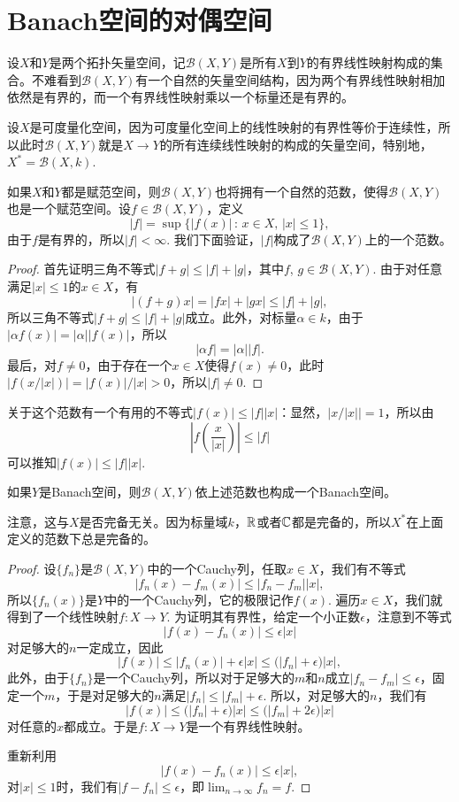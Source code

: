 \chapter{Banach空间的对偶空间}

\begin{para}
设$X$和$Y$是两个拓扑矢量空间，记$\mathcal{B}(X,Y)$是所有$X$到$Y$的有界线性映射构成的集合。不难看到$\mathcal{B}(X,Y)$有一个自然的矢量空间结构，因为两个有界线性映射相加依然是有界的，而一个有界线性映射乘以一个标量还是有界的。

设$X$是可度量化空间，因为可度量化空间上的线性映射的有界性等价于连续性，所以此时$\mathcal{B}(X,Y)$就是$X\to Y$的所有连续线性映射的构成的矢量空间，特别地，$X^*=\mathcal{B}(X,k)$.

如果$X$和$Y$都是赋范空间，则$\mathcal{B}(X,Y)$也将拥有一个自然的范数，使得$\mathcal{B}(X,Y)$也是一个赋范空间。设$f\in \mathcal{B}(X,Y)$，定义
\[
	|f|=\sup\bigl\{|f(x)|\,:\,x\in X,\,|x|\leq 1\bigr\},
\]
由于$f$是有界的，所以$|f|<\infty$. 我们下面验证，$|f|$构成了$\mathcal{B}(X,Y)$上的一个范数。

\begin{proof}
首先证明三角不等式$|f+g|\leq |f|+|g|$，其中$f$, $g\in \mathcal{B}(X,Y)$. 由于对任意满足$|x|\leq 1$的$x\in X$，有
\[
	|(f+g)x|=|fx|+|gx|\leq |f|+|g|,
\]
所以三角不等式$|f+g|\leq |f|+|g|$成立。此外，对标量$\alpha\in k$，由于$|\alpha f(x)|=|\alpha||f(x)|$，所以
\[
	|\alpha f|=|\alpha||f|.
\]
最后，对$f\neq 0$，由于存在一个$x\in X$使得$f(x)\neq 0$，此时$|f(x/|x|)|=|f(x)|/|x|>0$，所以$|f|\neq 0$.
\end{proof}

关于这个范数有一个有用的不等式$|f(x)|\leq |f||x|$：显然，$|x/|x||=1$，所以由
\[
	\left|f\left(\frac{x}{|x|}\right)\right|\leq |f|
\]
可以推知$|f(x)|\leq |f||x|$. 
\end{para}

\begin{pro}
如果$Y$是Banach空间，则$\mathcal{B}(X,Y)$依上述范数也构成一个Banach空间。
\end{pro}

注意，这与$X$是否完备无关。因为标量域$k$，$\mathbb{R}$或者$\mathbb{C}$都是完备的，所以$X^*$在上面定义的范数下总是完备的。

\begin{proof}
	设$\{f_n\}$是$\mathcal{B}(X,Y)$中的一个Cauchy列，任取$x\in X$，我们有不等式
	\[
	|f_n(x)-f_m(x)|\leq |f_n-f_m||x|,
	\]
	所以$\{f_n(x)\}$是$Y$中的一个Cauchy列，它的极限记作$f(x)$. 遍历$x\in X$，我们就得到了一个线性映射$f:X\to Y$. 为证明其有界性，给定一个小正数$\epsilon$，注意到不等式
	\[
	|f(x)-f_n(x)|\leq \epsilon |x|
	\]
	对足够大的$n$一定成立，因此
	\[
	|f(x)|\leq |f_n(x)|+\epsilon|x|\leq \bigl(|f_n|+\epsilon\bigr) |x|,
	\]
	此外，由于$\{f_n\}$是一个Cauchy列，所以对于足够大的$m$和$n$成立$|f_n-f_m|\leq \epsilon$，固定一个$m$，于是对足够大的$n$满足$|f_n|\leq |f_m|+\epsilon$. 所以，对足够大的$n$，我们有
	\[
	|f(x)|\leq \bigl(|f_n|+\epsilon\bigr) |x|\leq \bigl(|f_m|+2\epsilon\bigr) |x|
	\]
	对任意的$x$都成立。于是$f:X\to Y$是一个有界线性映射。

	重新利用
	\[
	|f(x)-f_n(x)|\leq \epsilon |x|,
	\]
	对$|x|\leq 1$时，我们有$|f-f_n|\leq \epsilon$，即$\lim_{n\to\infty}f_n=f$.
\end{proof}

